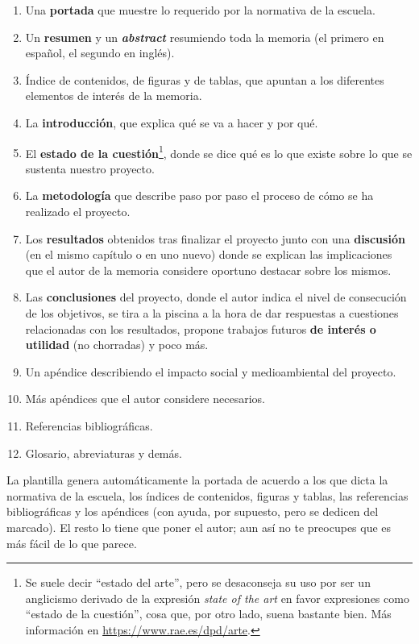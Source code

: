 \documentclass[%
    school=etsisi,%
    degree=61TI,%
]{upm-report}
\begin{document}
\begin{enumerate}
    \item Una \textbf{portada} que muestre lo requerido por la normativa
        de la escuela.
    \item Un \textbf{resumen} y un \textbf{\textit{abstract}} resumiendo
        toda la memoria (el primero en español, el segundo en inglés).
    \item Índice de contenidos, de figuras y de tablas, que apuntan a
        los diferentes elementos de interés de la memoria.
    \item La \textbf{introducción}, que explica qué se va a hacer y por
        qué.
    \item El \textbf{estado de la cuestión}\footnote{Se suele decir
        \enquote{estado del arte}, pero se desaconseja su uso por ser
        un anglicismo derivado de la expresión \textit{state of the art}
        en favor expresiones como \enquote{estado de la cuestión}, cosa
        que, por otro lado, suena bastante bien. Más información en
        \url{https://www.rae.es/dpd/arte}.}, donde se dice qué es lo que
        existe sobre lo que se sustenta nuestro proyecto.
    \item La \textbf{metodología} que describe paso por paso el proceso
        de cómo se ha realizado el proyecto.
    \item Los \textbf{resultados} obtenidos tras finalizar el proyecto
        junto con una \textbf{discusión} (en el mismo capítulo o en uno
        nuevo) donde se explican las implicaciones que el autor de la
        memoria considere oportuno destacar sobre los mismos.
    \item Las \textbf{conclusiones} del proyecto, donde el autor indica
        el nivel de consecución de los objetivos, se tira a la piscina
        a la hora de dar respuestas a cuestiones relacionadas con los
        resultados, propone trabajos futuros \textbf{de interés o
        utilidad} (no chorradas) y poco más.
    \item Un apéndice describiendo el impacto social y medioambiental
        del proyecto.
    \item Más apéndices que el autor considere necesarios.
    \item Referencias bibliográficas.
    \item Glosario, abreviaturas y demás.
\end{enumerate}

La plantilla genera automáticamente la portada de acuerdo a los que
dicta la normativa de la escuela, los índices de contenidos, figuras y
tablas, las referencias bibliográficas y los apéndices (con ayuda, por
supuesto, pero se dedicen del marcado). El resto lo tiene que poner el
autor; aun así no te preocupes que es más fácil de lo que parece.
\end{document}
